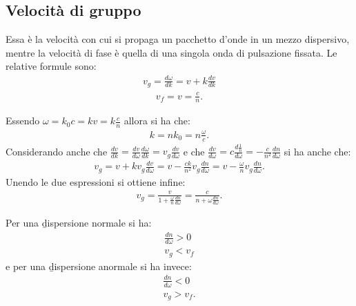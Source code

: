 \subsection{Velocità di gruppo}
Essa è la velocità con cui si propaga un pacchetto d'onde in un mezzo dispersivo, mentre la velocità di fase è quella di una singola onda di pulsazione fissata. Le relative formule sono:
\begin{equation}\begin{split}
v_g=\frac{d\omega}{dk}=v+k\frac{dv}{dk}
\end{split}\end{equation}
\begin{equation}\begin{split}
v_f=v=\frac{c}{n}.
\end{split}\end{equation}

Essendo $\omega=k_0c=kv=k\frac{c}{n}$ allora si ha che:
\begin{equation}\begin{split}
k=nk_0=n\frac{\omega}{c}.
\end{split}\end{equation}
Considerando anche che $\frac{dv}{dk}=\frac{dv}{d\omega}\frac{d\omega}{dk}=v_g\frac{dv}{d\omega}$ e che $\frac{dv}{d\omega}=c\frac{d{\frac{1}{n}}}{d\omega}=-\frac{c}{n^2}\frac{dn}{d\omega}$ si ha anche che:
\begin{equation}\begin{split}
v_g=v+kv_g\frac{dv}{d\omega}=v-\frac{ck}{n^2}v_g\frac{dn}{d\omega}=v-\frac{\omega}{n}v_g\frac{dn}{d\omega}.
\end{split}\end{equation}
Unendo le due espressioni si ottiene infine:
\begin{equation}\begin{split}
v_g=\frac{v}{1+\frac{\omega}{n}\frac{dn}{d\omega}}=\frac{c}{n+\omega\frac{dn}{d\omega}}.
\end{split}\end{equation}

Per una \b{dispersione normale} si ha:
\begin{equation}\begin{split}
\frac{dn}{d\omega}>0\\
v_g<v_f
\end{split}\end{equation}
e per una \b{dispersione anormale} si ha invece:
\begin{equation}\begin{split}
\frac{dn}{d\omega}<0\\
v_g>v_f.
\end{split}\end{equation}